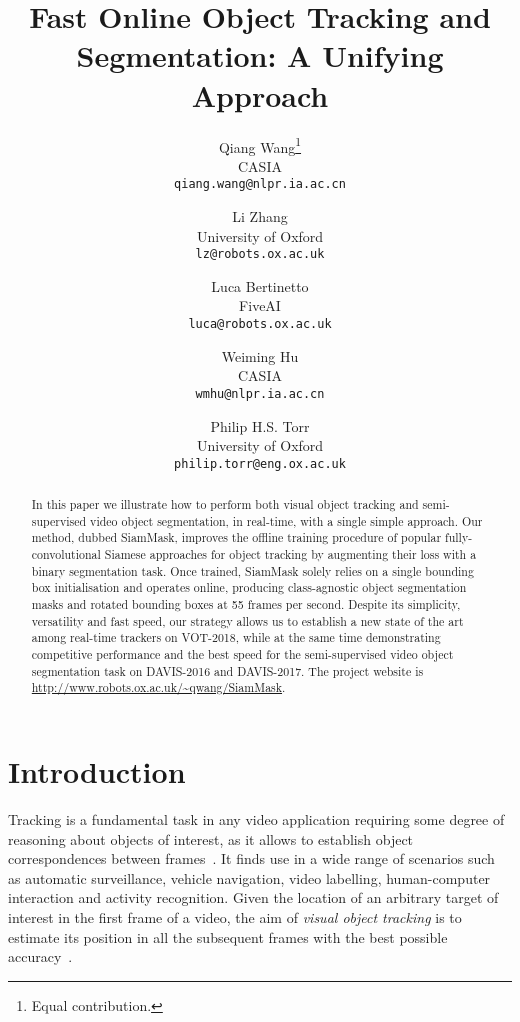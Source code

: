 \documentclass[10pt,twocolumn,letterpaper]{article}
\begin{document}
\title{Fast Online Object Tracking and Segmentation: A Unifying Approach}

\author{Qiang Wang\thanks{Equal contribution.}\\
CASIA\\
{\tt\small qiang.wang@nlpr.ia.ac.cn}
\and
Li Zhang\\
University of Oxford\\
{\tt\small lz@robots.ox.ac.uk}
\and
Luca Bertinetto\\
FiveAI\\
{\tt\small luca@robots.ox.ac.uk}
\and
Weiming Hu\\
CASIA\\
{\tt\small wmhu@nlpr.ia.ac.cn}
\and
Philip H.S. Torr\\
University of Oxford\\
{\tt\small philip.torr@eng.ox.ac.uk}
}

\maketitle
\begin{abstract}
\noindent 
In this paper we illustrate how to perform both visual object tracking and semi-supervised video object segmentation, in real-time, with a single simple approach.
Our method, dubbed SiamMask, improves the offline training procedure of popular fully-convolutional Siamese approaches for object tracking by augmenting their loss with a binary segmentation task.
Once trained, SiamMask solely relies on a single bounding box initialisation and operates online, producing class-agnostic object segmentation masks and rotated bounding boxes at 55 frames per second.
Despite its simplicity, versatility and fast speed, our strategy allows us to establish a new state of the art among real-time trackers on VOT-2018, while at the same time demonstrating competitive performance and the best speed for the semi-supervised video object segmentation task on DAVIS-2016 and DAVIS-2017. 
The project website is \url{http://www.robots.ox.ac.uk/~qwang/SiamMask}.
\end{abstract}
 
\section{Introduction}
Tracking is a fundamental task in any video application requiring some degree of reasoning about objects of interest, as it allows to establish object correspondences between frames~\cite{makovski2008visual}. 
It finds use in a wide range of scenarios such as automatic surveillance, vehicle navigation, video labelling, human-computer interaction and activity recognition.
Given the location of an arbitrary target of interest in the first frame of a video, the aim of \emph{visual object tracking} is to estimate its position in all the subsequent frames with the best possible accuracy~\cite{smeulders2014visual}.
\end{document}

